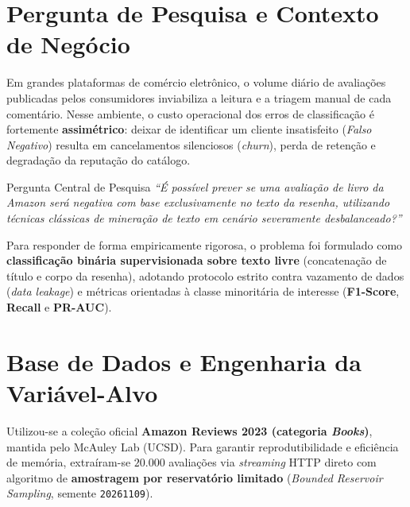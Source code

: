 \documentclass[10pt,a4paper]{article}
\begin{document}
\vspace{6pt}

\section{Pergunta de Pesquisa e Contexto de Negócio}

Em grandes plataformas de comércio eletrônico, o volume diário de avaliações publicadas pelos consumidores inviabiliza a leitura e a triagem manual de cada comentário. Nesse ambiente, o custo operacional dos erros de classificação é fortemente \textbf{assimétrico}: deixar de identificar um cliente insatisfeito (\textit{Falso Negativo}) resulta em cancelamentos silenciosos (\textit{churn}), perda de retenção e degradação da reputação do catálogo.

\begin{execbox}{Pergunta Central de Pesquisa}
\small \textit{``É possível prever se uma avaliação de livro da Amazon será negativa com base exclusivamente no texto da resenha, utilizando técnicas clássicas de mineração de texto em cenário severamente desbalanceado?''}
\end{execbox}

Para responder de forma empiricamente rigorosa, o problema foi formulado como \textbf{classificação binária supervisionada sobre texto livre} (concatenação de título e corpo da resenha), adotando protocolo estrito contra vazamento de dados (\textit{data leakage}) e métricas orientadas à classe minoritária de interesse (\textbf{F1-Score}, \textbf{Recall} e \textbf{PR-AUC}).

\section{Base de Dados e Engenharia da Variável-Alvo}

Utilizou-se a coleção oficial \textbf{Amazon Reviews 2023 (categoria \textit{Books})}, mantida pelo McAuley Lab (UCSD). Para garantir reprodutibilidade e eficiência de memória, extraíram-se $20.000$ avaliações via \textit{streaming} HTTP direto com algoritmo de \textbf{amostragem por reservatório limitado} (\textit{Bounded Reservoir Sampling}, semente \texttt{20261109}).
\end{document}

